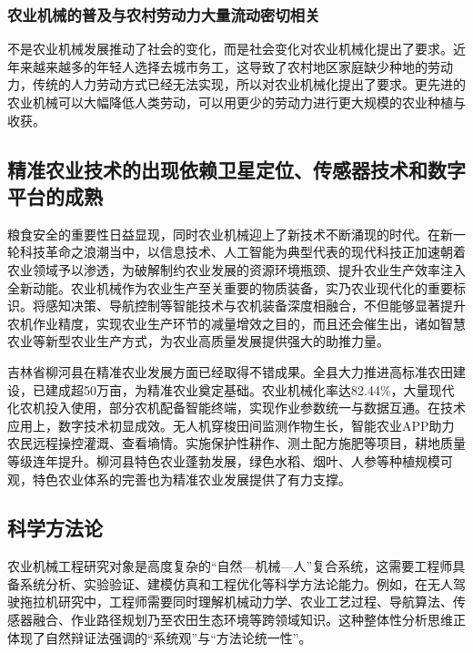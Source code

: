 \documentclass[12pt,fontset=windows,titlepage]{ctexart}
\begin{document}
	\subsubsection{农业机械的普及与农村劳动力大量流动密切相关}

	不是农业机械发展推动了社会的变化，而是社会变化对农业机械化提出了要求。近年来越来越多的年轻人选择去城市务工，这导致了农村地区家庭缺少种地的劳动力\autocite{MeiDongNongYeSheHuiHuaFuWuDuiDaoNongShengChanJiShuXiaoLuDeYingXiangYanJiu2025}，传统的人力劳动方式已经无法实现，所以对农业机械化提出了要求。更先进的农业机械可以大幅降低人类劳动，可以用更少的劳动力进行更大规模的农业种植与收获。

	\subsection{精准农业技术的出现依赖卫星定位、传感器技术和数字平台的成熟}

	粮食安全的重要性日益显现，同时农业机械迎上了新技术不断涌现的时代。在新一轮科技革命之浪潮当中，以信息技术、人工智能为典型代表的现代科技正加速朝着农业领域予以渗透，为破解制约农业发展的资源环境瓶颈、提升农业生产效率注入全新动能。农业机械作为农业生产至关重要的物质装备，实乃农业现代化的重要标识。将感知决策、导航控制等智能技术与农机装备深度相融合，不但能够显著提升农机作业精度，实现农业生产环节的减量增效之目的，而且还会催生出，诸如智慧农业等新型农业生产方式，为农业高质量发展提供强大的助推力量\autocite{LiYingNongZuoWuJingZhunZhongZhiGuoChengZhongNongYeJiJieZhiNengHuaYingYongJiShuDeChuangXinTanSuo2025}。

	吉林省柳河县在精准农业发展方面已经取得不错成果。全县大力推进高标准农田建设，已建成超50万亩，为精准农业奠定基础。农业机械化率达82.44\%，大量现代化农机投入使用，部分农机配备智能终端，实现作业参数统一与数据互通。在技术应用上，数字技术初显成效。无人机穿梭田间监测作物生长，智能农业APP助力农民远程操控灌溉、查看墒情。实施保护性耕作、测土配方施肥等项目，耕地质量等级连年提升。柳河县特色农业蓬勃发展，绿色水稻、烟叶、人参等种植规模可观，特色农业体系的完善也为精准农业发展提供了有力支撑\autocite{JuYunQiaoNongYeJiJieZiDongHuaJiShuZaiJingZhunNongYeZhongDeYingYongYuYingXiangFenXi2025}。
	
	\subsection{科学方法论}

	农业机械工程研究对象是高度复杂的“自然—机械—人”复合系统，这需要工程师具备系统分析、实验验证、建模仿真和工程优化等科学方法论能力。例如，在无人驾驶拖拉机研究中，工程师需要同时理解机械动力学、农业工艺过程、导航算法、传感器融合、作业路径规划乃至农田生态环境等跨领域知识。这种整体性分析思维正体现了自然辩证法强调的“系统观”与“方法论统一性”。
\end{document}
